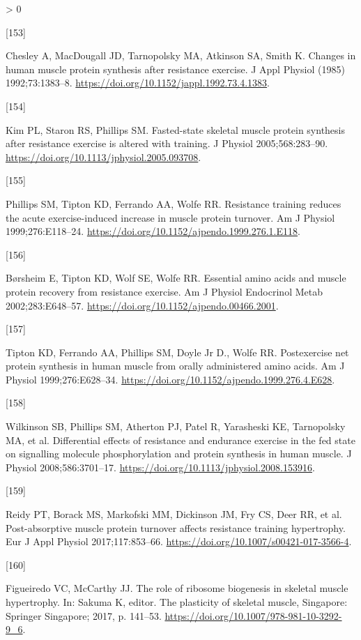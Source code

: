 \documentclass[twoside,10pt]{gihclass} %
\newlength{\cslhangindent}
\newlength{\csllabelwidth}
\newenvironment{CSLReferences}[3] %
 {%
  \setlength{\parindent}{0pt}
  \ifodd #1 \everypar{\setlength{\hangindent}{\cslhangindent}}\ignorespaces\fi
  \ifnum #2 > 0
  \setlength{\parskip}{#2\baselineskip}
  \fi
 }%
 {}
\newcommand{\CSLLeftMargin}[1]{\parbox[t]{\maxof{\widthof{#1}}{\csllabelwidth}}{#1}}
\newcommand{\CSLRightInline}[1]{\parbox[t]{\linewidth}{#1}}
\begin{document}
\begin{CSLReferences}{0}{0}
\leavevmode\hypertarget{ref-RN2717}{}%
\CSLLeftMargin{{[}153{]} }
\CSLRightInline{Chesley A, MacDougall JD, Tarnopolsky MA, Atkinson SA, Smith K. Changes in human muscle protein synthesis after resistance exercise. J Appl Physiol (1985) 1992;73:1383--8. \url{https://doi.org/10.1152/jappl.1992.73.4.1383}.}

\leavevmode\hypertarget{ref-RN1521}{}%
\CSLLeftMargin{{[}154{]} }
\CSLRightInline{Kim PL, Staron RS, Phillips SM. Fasted-state skeletal muscle protein synthesis after resistance exercise is altered with training. J Physiol 2005;568:283--90. \url{https://doi.org/10.1113/jphysiol.2005.093708}.}

\leavevmode\hypertarget{ref-RN2713}{}%
\CSLLeftMargin{{[}155{]} }
\CSLRightInline{Phillips SM, Tipton KD, Ferrando AA, Wolfe RR. Resistance training reduces the acute exercise-induced increase in muscle protein turnover. Am J Physiol 1999;276:E118--24. \url{https://doi.org/10.1152/ajpendo.1999.276.1.E118}.}

\leavevmode\hypertarget{ref-RN2714}{}%
\CSLLeftMargin{{[}156{]} }
\CSLRightInline{Børsheim E, Tipton KD, Wolf SE, Wolfe RR. Essential amino acids and muscle protein recovery from resistance exercise. Am J Physiol Endocrinol Metab 2002;283:E648--57. \url{https://doi.org/10.1152/ajpendo.00466.2001}.}

\leavevmode\hypertarget{ref-RN2715}{}%
\CSLLeftMargin{{[}157{]} }
\CSLRightInline{Tipton KD, Ferrando AA, Phillips SM, Doyle Jr D., Wolfe RR. Postexercise net protein synthesis in human muscle from orally administered amino acids. Am J Physiol 1999;276:E628--34. \url{https://doi.org/10.1152/ajpendo.1999.276.4.E628}.}

\leavevmode\hypertarget{ref-RN1866}{}%
\CSLLeftMargin{{[}158{]} }
\CSLRightInline{Wilkinson SB, Phillips SM, Atherton PJ, Patel R, Yarasheski KE, Tarnopolsky MA, et al. Differential effects of resistance and endurance exercise in the fed state on signalling molecule phosphorylation and protein synthesis in human muscle. J Physiol 2008;586:3701--17. \url{https://doi.org/10.1113/jphysiol.2008.153916}.}

\leavevmode\hypertarget{ref-RN1897}{}%
\CSLLeftMargin{{[}159{]} }
\CSLRightInline{Reidy PT, Borack MS, Markofski MM, Dickinson JM, Fry CS, Deer RR, et al. Post-absorptive muscle protein turnover affects resistance training hypertrophy. Eur J Appl Physiol 2017;117:853--66. \url{https://doi.org/10.1007/s00421-017-3566-4}.}

\leavevmode\hypertarget{ref-RN1912}{}%
\CSLLeftMargin{{[}160{]} }
\CSLRightInline{Figueiredo VC, McCarthy JJ. The role of ribosome biogenesis in skeletal muscle hypertrophy. In: Sakuma K, editor. The plasticity of skeletal muscle, Singapore: Springer Singapore; 2017, p. 141--53. \url{https://doi.org/10.1007/978-981-10-3292-9_6}.}


\end{CSLReferences}
\end{document}

